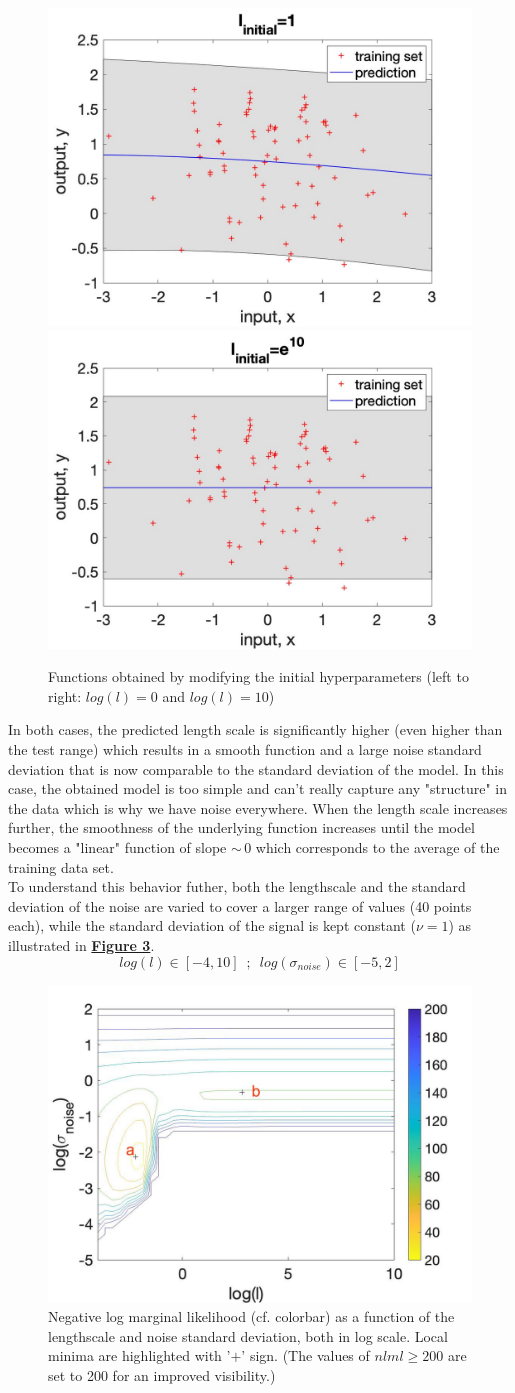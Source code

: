 \documentclass[a4paper,11pt]{article}
\begin{document}
\begin{figure}[h]
	\centering
	\includegraphics[width=.48\linewidth]{figures/b4.jpg}
	\includegraphics[width=.48\linewidth]{figures/b2.jpg}
	\caption{Functions obtained by modifying the initial hyperparameters (left to right: $log(l)=0$ and $log(l)=10$)}
	\label{fig:2}
\end{figure}
\noindent
In both cases, the predicted length scale is significantly higher (even higher than the test range) which results in a smooth function and a large noise standard deviation that is now comparable to the standard deviation of the model. In this case, the obtained model is too simple and can't really capture any "structure" in the data which is why we have noise everywhere. When the length scale increases further, the smoothness of the underlying function increases until the model becomes a "linear" function of slope $\sim\,0$ which corresponds to the average of the training data set.\\
To understand this behavior futher, both the lengthscale and the standard deviation of the noise are varied to cover a larger range of values (40 points each), while the standard deviation of the signal is kept constant ($\nu=1$) as illustrated in \hyperref[fig:2]{\textbf{Figure 3}}.
\[
log(l) \in [-4, 10] \,\,\,;\,\,\, log(\sigma_{noise}) \in [-5,2]
\]
\begin{figure}[H]
	\centering
	\includegraphics[width=.6\linewidth]{figures/b_contour_fixed.jpg}
	\caption{Negative log marginal likelihood (cf. colorbar) as a function of the lengthscale and noise standard deviation, both in log scale. Local minima are highlighted with '$+$' sign. (The values of $nlml \geq 200$ are set to 200 for an improved visibility.)}
	\label{fig:3}
\end{figure}
\end{document}

